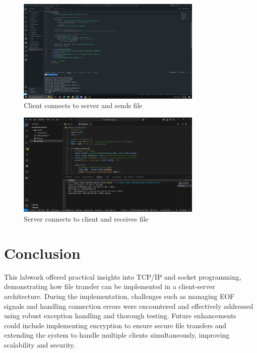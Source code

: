\documentclass{article}
\begin{document}
\begin{figure}[h!]
    \centering
    \includegraphics[width=0.8\textwidth]{Client.png} %
    \caption{Client connects to server and sends file}
    \label{fig:client}
\end{figure}
\clearpage
\begin{figure}[h!]
    \centering
    \includegraphics[width=0.8\textwidth]{Server.png} %
    \caption{Server connects to client and receives file}
    \label{fig:server}
\end{figure}

\section{Conclusion}
This labwork offered practical insights into TCP/IP and socket programming, demonstrating how file transfer can be implemented in a client-server architecture. During the implementation, challenges such as managing EOF signals and handling connection errors were encountered and effectively addressed using robust exception handling and thorough testing. Future enhancements could include implementing encryption to ensure secure file transfers and extending the system to handle multiple clients simultaneously, improving scalability and security.
\end{document}
